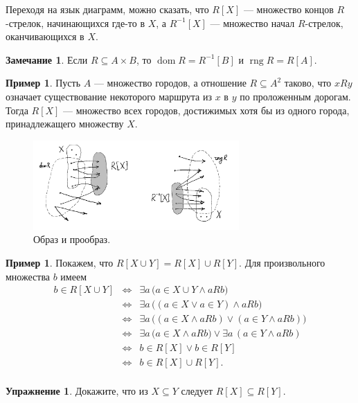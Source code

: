 \documentclass[12pt,notitlepage]{article}
\theoremstyle{plain}
\theoremstyle{definition}
\newtheorem{exc}[thm]{Упражнение}
\newtheorem{exm}[thm]{Пример}
\newtheorem{rem}[thm]{Замечание}
\theoremstyle{plain}
\newcommand{\sbs}{\subseteq}
\newcommand{\dom}{\mathop{\mathrm{dom}}}
\newcommand{\rng}{\mathop{\mathrm{rng}}}
\newcommand{\1}{\mathbf{1}}
\newcommand{\0}{\mathbf{0}}
\begin{document}
Переходя на язык диаграмм, можно сказать, что $R[X]$ --- множество концов $R$-стрелок, начинающихся где-то в $X$, а $R^{-1}[X]$ --- множество начал $R$-стрелок, оканчивающихся в $X$.

\begin{rem}
	Если $R \sbs A \times B$, то $\dom R = R^{-1}[B]$ и $\rng R = R[A]$.
\end{rem}

\begin{exm}
	Пусть $A$ --- множество городов, а отношение $R \sbs A^2$ таково, что $xRy$ означает существование некоторого маршрута из $x$ в $y$ по проложенным дорогам. Тогда $R[X]$ --- множество всех городов, достижимых хотя бы из одного города, принадлежащего множеству $X$.
\end{exm}

\begin{figure}[h]
	\centering
	\includegraphics*[width=0.7\textwidth]{rel_img.pdf}
	\caption{Образ и прообраз.}
\end{figure}

\begin{exm}
	Покажем, что $R[X \cup Y] = R[X] \cup R[Y]$.
	Для произвольного множества $b$ имеем
	$$
	\begin{array}{rcl}
		b \in R[X \cup Y] &\iff& \exists a\, \bigl(a \in X \cup Y \wedge a R b \bigr)\\
		&\iff& \exists a\, \bigl((a \in X \vee a \in Y) \wedge a R b \bigr)\\
		&\iff& \exists a\, \bigl((a \in X \wedge a R b) \vee (a \in Y \wedge a R b)\bigr)\\
		&\iff& \exists a\, \bigl(a \in X \wedge a R b) \vee \exists a\, (a \in Y \wedge a R b)\\
		&\iff& b \in R[X] \vee b \in R[Y]\\
		&\iff& b \in R[X] \cup R[Y].\\
	\end{array}
	$$
\end{exm}

\begin{exc}\label{ch0:img_monot}
	Докажите, что из $X \sbs Y$ следует $R[X] \sbs R[Y]$.
\end{exc}
\end{document}

